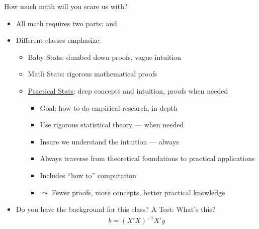 \documentclass[12pt,ignorenonframetext,compress]{beamer}
\providecommand{\tightlist}{%
  \setlength{\itemsep}{0pt}\setlength{\parskip}{0pt}}
\begin{document}
\begin{frame}{How much math will you scare us with?}
\protect\hypertarget{how-much-math-will-you-scare-us-with}{}

\begin{itemize}
\tightlist
\item
  All math requires two parts:  and
\item
  Different classes emphasize:

  \begin{itemize}
  \tightlist
  \item
    \alert{Baby Stats}: dumbed down proofs, vague intuition
  \item
    \alert{Math Stats}: rigorous mathematical proofs
  \item
    \alert{\underline{Practical Stats}}: deep concepts and intuition,
    proofs when needed

    \begin{itemize}
    \tightlist
    \item
      Goal: how to do empirical research, in depth
    \item
      Use rigorous statistical theory --- when needed
    \item
      Insure we understand the intuition --- always
    \item
      Always traverse from theoretical foundations to practical
      applications
    \item
      Includes ``how to'' computation
    \item
      \(\leadsto\) Fewer proofs, more concepts, better practical
      knowledge
    \end{itemize}
  \end{itemize}
\item
  Do you have the background for this class? \alert{A Test: What's this?
    \begin{align*}
      b=(X'X)^{-1}X'y
    \end{align*} }
\end{itemize}

\end{frame}
\end{document}
